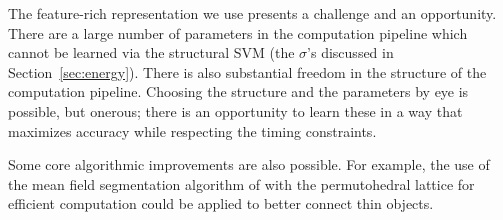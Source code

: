 \documentclass[conference]{IEEEtran}
\begin{document}
The feature-rich representation we use presents a challenge and an opportunity.  There are a large number of parameters in the computation pipeline which cannot be learned via the structural SVM (\eg the $\sigma$'s discussed in Section~\ref{sec:energy}). There is also substantial freedom in the structure of the computation pipeline.  Choosing the structure and the parameters by eye is possible, but onerous; there is an opportunity to learn these in a way that maximizes accuracy while respecting the timing constraints.

Some core algorithmic improvements are also possible.  For example, the use of the mean field segmentation algorithm of \citet{krahenbuhl2011a} with the permutohedral lattice for efficient computation could be applied to better connect thin objects.



\end{document}
